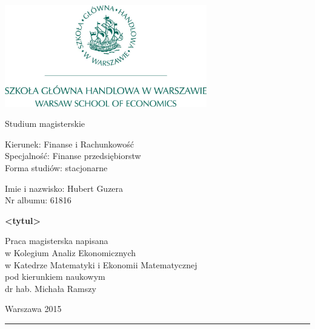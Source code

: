 \documentclass[polish, twoside, 12pt, a4paper]{article}
\theoremstyle{definition}
\theoremstyle{plain}
\theoremstyle{remark}
\begin{document}
\begin{titlepage}
\centering

\includegraphics[width=0.66\textwidth]{logo.JPG}

\vspace*{0.5cm}
Studium magisterskie\\
\begin{flushleft}
Kierunek: Finanse i Rachunkowość\\
Specjalność: Finanse przedsiębiorstw\\
Forma studiów: stacjonarne
\end{flushleft}

\vspace*{.5cm}
\rule{0cm}{1cm}\hfill
\begin{minipage}{9cm}
Imie i nazwisko: Hubert Guzera\\
Nr albumu: 61816
\end{minipage}

\vspace*{1cm}
\begin{minipage}{12cm}
\centering
\Large
\textbf{<tytul>}
\end{minipage}

\vspace*{2cm}
\rule{0cm}{1cm}\hfill
\begin{minipage}{9cm}
Praca magisterska napisana\\
w Kolegium Analiz Ekonomicznych\\
w Katedrze Matematyki i Ekonomii Matematycznej\\
pod kierunkiem naukowym\\
dr hab. Michała Ramszy
\end{minipage}

\vfill
Warszawa 2015
\end{titlepage}

\rule{1ex}{0ex}\clearpage


\cleardoublepage
\tableofcontents
\end{document}
